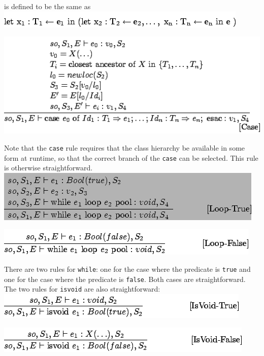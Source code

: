 \documentclass[]{article}
\begin{document}
is defined to be the same as \\

\includegraphics{img174.png}

\includegraphics{img175.png}

Note that the \texttt{case} rule requires that the class hierarchy be
available in some form at runtime, so that the correct branch of the
\texttt{case} can be selected. This rule is otherwise straightforward.
\\

\includegraphics{img176.png}

\includegraphics{img177.png}

There are two rules for \texttt{while}: one for the case where the
predicate is \texttt{true} and one for the case where the predicate is
\texttt{false}. Both cases are straightforward. The two rules for
\texttt{isvoid} are also straightforward: \\

\includegraphics{img178.png}

\includegraphics{img179.png}
\end{document}
